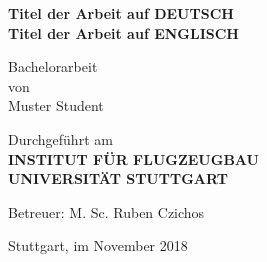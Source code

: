 \begin{center}
	\begin{Large}
	\textbf{Titel der Arbeit auf DEUTSCH}\\
	\vspace{1cm}
	\textbf{Titel der Arbeit auf ENGLISCH}
\end{Large}

\vspace{4cm}

Bachelorarbeit\\
von\\
Muster Student

\vspace{4cm}

Durchgef\"uhrt am\\
\vspace{0.5cm}
\textbf{INSTITUT F\"UR FLUGZEUGBAU}\\
\textbf{UNIVERSIT\"AT STUTTGART}\\

\vspace{2cm}

Betreuer: M. Sc. Ruben Czichos

\vspace{2cm}

Stuttgart, im November 2018
\end{center}